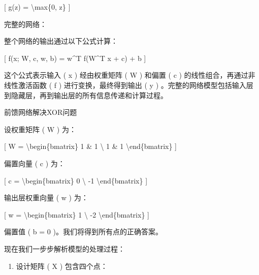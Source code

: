 {[} g(z) = \textbackslash max\{0, z\} {]}


完整的网络：

整个网络的输出通过以下公式计算：

{[} f(x; W, c, w, b) = w\^{}T f(W\^{}T x + c) + b {]}


这个公式表示输入 ( x ) 经由权重矩阵 ( W ) 和偏置 ( c )
的线性组合，再通过非线性激活函数 ( f ) 进行变换，最终得到输出 ( y )
。完整的网络模型包括输入层到隐藏层，再到输出层的所有信息传递和计算过程。

前馈网络解决XOR问题

设权重矩阵 ( W ) 为：

{[} W = \textbackslash begin\{bmatrix\} 1 \& 1 \textbackslash{} 1 \& 1
\textbackslash end\{bmatrix\} {]}


偏置向量 ( c ) 为：

{[} c = \textbackslash begin\{bmatrix\} 0 \textbackslash{} -1
\textbackslash end\{bmatrix\} {]}


输出层权重向量 ( w ) 为：

{[} w = \textbackslash begin\{bmatrix\} 1 \textbackslash{} -2
\textbackslash end\{bmatrix\} {]}


偏置值 ( b = 0 )。我们将得到所有点的正确答案。

现在我们一步步解析模型的处理过程：

\begin{enumerate}
\def\labelenumi{\arabic{enumi}.}
\item
  设计矩阵 ( X ) 包含四个点：
\end{enumerate}

